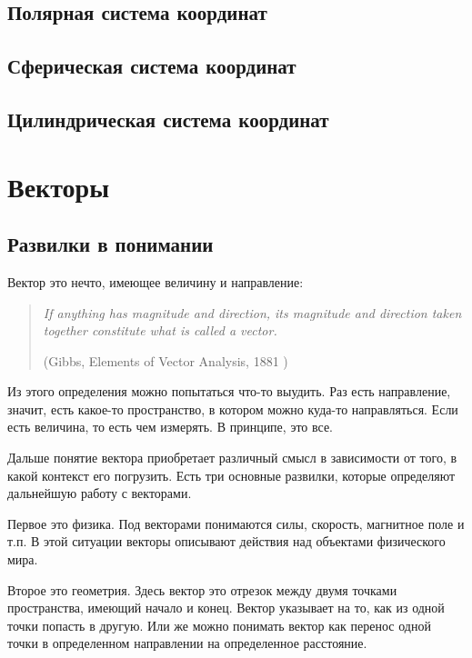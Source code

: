 \documentclass[a4paper,12pt]{article}
\newcounter{th-counter}
\begin{document}
\subsection*{Полярная система координат}

\subsection*{Сферическая система координат}

\subsection*{Цилиндрическая система координат}


\section*{Векторы}
\subsection*{Развилки в понимании}
Вектор это нечто, имеющее величину и направление:
\begin{quote}
\itshape
If anything has magnitude and direction, its magnitude and direction taken together constitute what is called a vector. 

(Gibbs, Elements of Vector Analysis, 1881 \cite{GibbsVectorAnalysis})
\end{quote}

Из этого определения можно попытаться что-то выудить. Раз есть направление, значит, есть какое-то пространство, в котором можно куда-то направляться. Если есть величина, то есть чем измерять. В принципе, это все.

Дальше понятие вектора приобретает различный смысл в зависимости от того, в какой контекст его погрузить. Есть три основные развилки, которые определяют дальнейшую работу с векторами.

Первое это физика. Под векторами понимаются силы, скорость, магнитное поле и т.п. В этой ситуации векторы описывают действия над объектами физического мира.

Второе это геометрия. Здесь вектор это отрезок между двумя точками пространства, имеющий начало и конец. Вектор указывает на то, как из одной точки попасть в другую. Или же можно понимать вектор как перенос одной точки в определенном направлении на определенное расстояние.
\end{document}
